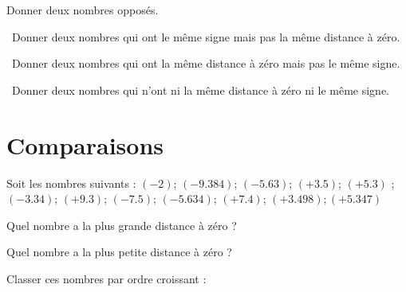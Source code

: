 \begin{questions}
	
	\question[1] Donner deux nombres opposés.
	\fillwithdottedlines{1cm}
	

	\question[1]  Donner deux nombres qui ont le même signe mais pas la même distance à zéro.
	\fillwithdottedlines{1cm}

	\question[1]  Donner deux nombres qui ont la même distance à zéro mais pas le même signe.
	\fillwithdottedlines{1cm}
	
	\question[1]  Donner deux nombres qui n'ont ni la même distance à zéro ni le même signe.
	\fillwithdottedlines{1cm}
\end{questions}



\section{Comparaisons}

Soit les nombres suivants :
$(-2)$; $(-\num{9.384})$; $(-\num{5.63})$; $(+\num{3.5})$; $(+\num{5.3})$ ; $(-\num{3.34})$; $(+\num{9.3})$; $(-\num{7.5})$; $(-\num{5.634})$; $(+\num{7.4}) $; $(+ \num{3.498} ); (+\num{5.347})$ 

\begin{questions}
	\question[1] Quel nombre a la plus grande distance à zéro ?
	\fillwithdottedlines{1cm}
	
	\question[1] Quel nombre a la plus petite distance à zéro ?
	\fillwithdottedlines{1cm}
	
	\question[2] Classer ces nombres par ordre croissant :
	\fillwithdottedlines{2cm}
\end{questions}

